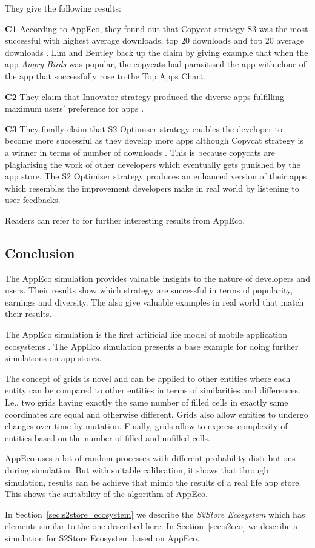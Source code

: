 They give the following results:

\textbf{C1} According to AppEco, they found out that Copycat strategy S3 was the most successful with highest average downloads, top 20 downloads and top 20 average downloads \cite{lim2012successful}. Lim and Bentley back up the claim by giving example that when the app \emph{Angry Birds} was popular, the copycats had parasitised the app with clone of the app that successfully rose to the Top Apps Chart.

\textbf{C2} They claim that Innovator strategy produced the diverse apps fulfilling maximum users' preference for apps \cite{lim2012successful}.

\textbf{C3} They finally claim that S2 Optimiser strategy enables the developer to become more successful as they develop more apps although Copycat strategy is a winner in terms of number of downloads \cite{lim2012successful}. This is because copycats are plagiarising the work of other developers which eventually gets punished by the app store. The S2 Optimiser strategy produces an enhanced version of their apps which resembles the improvement developers make in real world by listening to user feedbacks.

Readers can refer to \cite{lim2012successful} for further interesting results from AppEco.

\subsection{Conclusion}

The AppEco simulation provides valuable insights to the nature of developers and users. Their results show which strategy are successful in terms of popularity, earnings and diversity. The also give valuable examples in real world that match their results.

The AppEco simulation is the first artificial life model of mobile application ecosystems \cite{lim2012successful}. The AppEco simulation presents a base example for doing further simulations on app stores.

The concept of grids is novel and can be applied to other entities where each entity can be compared to other entities in terms of similarities and differences. I.e., two grids having exactly the same number of filled cells in exactly same coordinates are equal and otherwise different. Grids also allow entities to undergo changes over time by mutation. Finally, grids allow to express complexity of entities based on the number of filled and unfilled cells.

AppEco uses a lot of random processes with different probability distributions during simulation. But with suitable calibration, it shows that through simulation, results can be achieve that mimic the results of a real life app store. This shows the suitability of the algorithm of AppEco.

In Section~\ref{sec:s2store_ecosystem} we describe the \emph{S2Store Ecosystem} which has elements similar to the one described here. In Section~\ref{sec:s2eco} we describe a simulation for S2Store Ecosystem based on AppEco.

